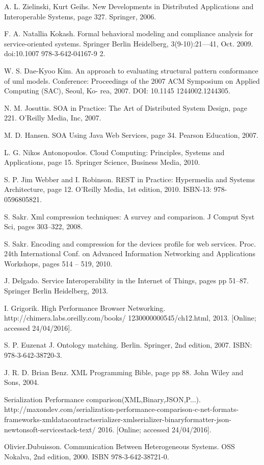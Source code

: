 \documentclass[runningheads,a4paper]{llncs}
\begin{document}
\begin{thebibliography}{4}


 A. L. Zielinski, Kurt Geihs. New Developments in Distributed Applications and Interoperable Systems, page 327. Springer, 2006.

 F. A. Natallia Kokash. Formal behavioral modeling and compliance analysis for service-oriented systems. Springer Berlin Heidelberg, 3(9-10):21––41, Oct. 2009. doi:10.1007 978-3-642-04167-9 2.

 W. S. Dae-Kyoo Kim. An approach to evaluating structural pattern conformance of uml models.
Conference: Proceedings of the 2007 ACM Symposium on Applied Computing (SAC), Seoul, Ko- rea, 2007. DOI: 10.1145 1244002.1244305.

 N. M. Josuttis. SOA in Practice: The Art of Distributed System Design, page 221. O’Reilly Media, Inc, 2007.

 M. D. Hansen. SOA Using Java Web Services, page 34. Pearson Education, 2007.

 L. G. Nikos Antonopoulos. Cloud Computing: Principles, Systems and Applications, page 15. Springer Science, Business Media, 2010.

 S. P. Jim Webber and I. Robinson. REST in Practice: Hypermedia and Systems Architecture,
page 12. O’Reilly Media, 1st edition, 2010. ISBN-13: 978-0596805821.

 S. Sakr. Xml compression techniques: A survey and comparison. J Comput Syst Sci, pages 303–322, 2008.

 S. Sakr. Encoding and compression for the devices profile for web services. Proc. 24th International Conf. on Advanced Information Networking and Applications Workshops, pages 514 – 519, 2010.

 J. Delgado. Service Interoperability in the Internet of Things, pages pp 51–87. Springer Berlin Heidelberg, 2013.

 I. Grigorik. High Performance Browser Networking. http://chimera.labs.oreilly.com/books/ 1230000000545/ch12.html, 2013. [Online; accessed 24/04/2016].

 S. P. Euzenat J. Ontology matching. Berlin. Springer, 2nd edition, 2007. ISBN: 978-3-642-38720-3.

 J. R. D. Brian Benz. XML Programming Bible, page pp 88. John Wiley and Sons, 2004.

 Serialization Performance comparison(XML,Binary,JSON,P...). http://maxondev.com/serialization-performance-comparison-c-net-formats-frameworks-xmldatacontractserializer-xmlserializer-binaryformatter-json-newtonsoft-servicestack-text/ 2016. [Online; accessed 24/04/2016].

 Olivier.Dubuisson. Communication Between Heterogeneous Systems. OSS Nokalva, 2nd edition, 2000. ISBN 978-3-642-38721-0.

\end{thebibliography}
\end{document}
